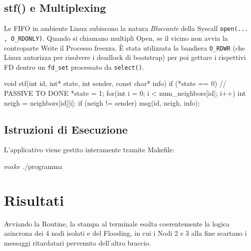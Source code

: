 \documentclass[a4paper,12pt]{article}
\begin{document}
\subsection{stf() e Multiplexing}
Le FIFO in ambiente Linux subiscono la natura \textit{Bloccante} della Syscall \texttt{open(... , O\_RDONLY)}. Quando si chiamano multipli Open, se il vicino non avvia la controparte Write il Processo freezza. È stata utilizzata la bandiera \texttt{O\_RDWR} (che Linux autorizza per risolvere i deadlock di bootstrap) per poi gettare i rispettivi FD dentro un \texttt{fd\_set} processato da \texttt{select()}.

\begin{ccode}
void stf(int id, int* state, int sender, const char* info) {
    if (*state == 0) { // PASSIVE TO DONE
        *state = 1; 
        for(int i = 0; i < num_neighbors[id]; i++) {
            int neigh = neighbors[id][i];
            if (neigh != sender) msg(id, neigh, info);
        }
    }
}
\end{ccode}


\subsection{Istruzioni di Esecuzione}
L'applicativo viene gestito interamente tramite Makefile:
\begin{terminal}
$ make
$ ./programma
\end{terminal}

\section{Risultati}
Avviando la Routine, la stampa al terminale esalta coerentemente la logica asincrona dei 4 nodi isolati e del Flooding, in cui i Nodi 2 e 3 alla fine scartano i messaggi ritardatari pervenuto dell'altro braccio.

\end{document}
